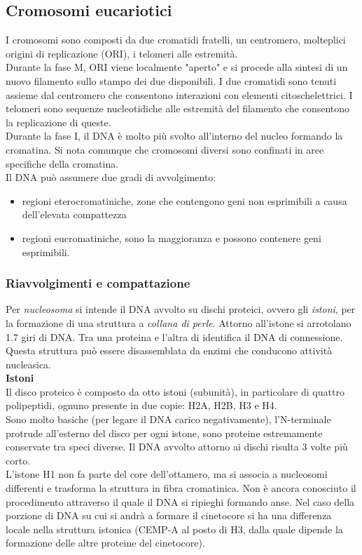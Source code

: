     \subsection{Cromosomi eucariotici}
        I cromosomi sono composti da due cromatidi fratelli, un centromero, molteplici origini di replicazione (ORI), i telomeri alle estremità.\\
        Durante la fase M, ORI viene localmente "aperto" e si procede alla sintesi di un nuovo filamento sullo stampo dei due disponibili. I due cromatidi sono tenuti assieme dal centromero che consentono interazioni con elementi citoschelettrici.
        I telomeri sono sequenze nucleotidiche alle estremità del filamento che consentono la replicazione di queste.\\
        Durante la fase I, il DNA è molto più svolto all'interno del nucleo formando la cromatina. Si nota comunque che cromosomi diversi sono confinati in aree specifiche della cromatina.\\
        Il DNA può assumere due gradi di avvolgimento:
        \begin{itemize}
            \item regioni eterocromatiniche, zone che contengono geni non esprimibili a causa dell'elevata compattezza
            \item regioni eucromatiniche, sono la maggioranza e possono contenere geni esprimibili.
        \end{itemize}
        
        \subsubsection{Riavvolgimenti e compattazione}
            Per \textit{nucleosoma} si intende il DNA avvolto su dischi proteici, ovvero gli \textit{istoni}, per la formazione di una struttura a \textit{collana di perle}. Attorno all'istone si arrotolano 1.7 giri di DNA. 
            Tra una proteina e l'altra di identifica il DNA di connessione. Questa struttura può essere disassemblata da enzimi che conducono attività nucleasica.\\
            
            \textbf{Istoni}\\
                Il disco proteico è composto da otto istoni (subunità), in particolare di quattro polipeptidi, ognuno presente in due copie: H2A, H2B, H3 e H4.\\
                Sono molto basiche (per legare il DNA carico negativamente), l'N-terminale protrude all'esterno del disco per ogni istone, sono proteine estremamente conservate tra speci diverse. Il DNA avvolto attorno ai dischi risulta 3 volte più corto.\\
                L'istone H1 non fa parte del core dell'ottamero, ma si associa a nucleosomi differenti e trasforma la struttura in fibra cromatinica. Non è ancora conosciuto il procedimento attraverso il quale il DNA si ripieghi formando anse.
                Nel caso della porzione di DNA su cui si andrà a formare il cinetocore si ha una differenza locale nella struttura istonica (CEMP-A al posto di H3, dalla quale dipende la formazione delle altre proteine del cinetocore).
                
